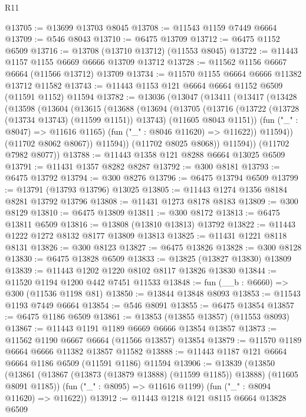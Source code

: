 \begin{lexlean}{R11}
\begin{coremodule}
{{{{{{{{{{{{{{{{{{{{{{{{{{{{{{{{{{{{{{{{{{{{{{{{{{{{{{{{{{{{{{{{{{{{{{{{{{{{{{{{{{@13705 := @13699 @13703 @8045
@13708 := @11543 @1159 @7449 @6664
@13709 := @546 @8043
@13710 := @6475 @13709
@13712 := @6475 @1152 @6509
@13716 := @13708 (@13710 @13712) (@11553 @8045)
@13722 := @11443 @1157 @1155 @6669 @6666 @13709 @13712
@13728 := @11562 @1156 @6667 @6664 (@11566 @13712) @13709
@13734 := @11570 @1155 @6664 @6666 @11382 @13712 @11582
@13743 := @11443 @1153 @121 @6664 @6664 @1152 @6509 (@11591 @1152) @11594
@13782 := @13036
    (@13047
      (@13411
        (@13417
          (@13428
            (@13598
              (@13604
                (@13615
                  (@13688
                    (@13694
                      (@13705
                        (@13716
                          (@13722 (@13728 (@13734 @13743) (@11599 @1151)) @13743)
                          (@11605 @8043 @1151))
                        (fun ("_" : @8047) => @11616 @1165)
                        (fun ("_" : @8046 @11620) => @11622))
                      @11594))
                  (@11702 @8062 @8067))
                @11594))
            (@11702 @8025 @8068))
          @11594))
      (@11702 @7982 @8077))
@13788 := @11443 @1358 @121 @8288 @6664 @13025 @6509
@13791 := @11431 @1357 @8282 @8287
@13792 := @300 @8181
@13793 := @6475 @13792
@13794 := @300 @8276
@13796 := @6475 @13794 @6509
@13799 := @13791 (@13793 @13796) @13025
@13805 := @11443 @1274 @1356 @8184 @8281 @13792 @13796
@13808 := @11431 @1273 @8178 @8183
@13809 := @300 @8129
@13810 := @6475 @13809
@13811 := @300 @8172
@13813 := @6475 @13811 @6509
@13816 := @13808 (@13810 @13813) @13792
@13822 := @11443 @1222 @1272 @8132 @8177 @13809 @13813
@13825 := @11431 @1221 @8118 @8131
@13826 := @300 @8123
@13827 := @6475 @13826
@13828 := @300 @8128
@13830 := @6475 @13828 @6509
@13833 := @13825 (@13827 @13830) @13809
@13839 := @11443 @1202 @1220 @8102 @8117 @13826 @13830
@13844 := @11520 @1194 @1200 @442 @7451 @11533
@13848 := fun (__b : @6660) => @300 (@11536 @1198 @81)
@13850 := @13844 @13848 @8093
@13853 := @11543 @1193 @7449 @6664
@13854 := @546 @8091
@13855 := @6475 @13854
@13857 := @6475 @1186 @6509
@13861 := @13853 (@13855 @13857) (@11553 @8093)
@13867 := @11443 @1191 @1189 @6669 @6666 @13854 @13857
@13873 := @11562 @1190 @6667 @6664 (@11566 @13857) @13854
@13879 := @11570 @1189 @6664 @6666 @11382 @13857 @11582
@13888 := @11443 @1187 @121 @6664 @6664 @1186 @6509 (@11591 @1186) @11594
@13906 := @13839
    (@13850
      (@13861 (@13867 (@13873 (@13879 @13888) (@11599 @1185)) @13888) (@11605 @8091 @1185))
      (fun ("_" : @8095) => @11616 @1199)
      (fun ("_" : @8094 @11620) => @11622))
@13912 := @11443 @1218 @121 @8115 @6664 @13828 @6509
}}}}}}}}}}}}}}}}}}}}}}}}}}}}}}}}}}}}}}}}}}}}}}}}}}}}}}}}}}}}}}}}}}}}}}}}}}}}}}}}}}
\end{coremodule}
\end{lexlean}
